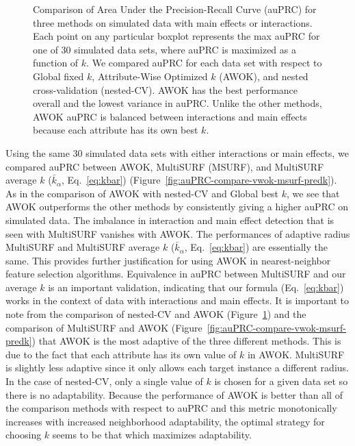 \documentclass[10pt,letterpaper]{article}
\begin{document}
\begin{figure}[!bht]
	\caption{Comparison of Area Under the Precision-Recall Curve (auPRC) for three methods on simulated data with main effects or interactions. Each point on any particular boxplot represents the max auPRC for one of 30 simulated data sets, where auPRC is maximized as a function of $k$. We compared auPRC for each data set with respect to Global fixed $k$, Attribute-Wise Optimized $k$ (AWOK), and nested cross-validation (nested-CV). AWOK has the best performance overall and the lowest variance in auPRC. Unlike the other methods, AWOK auPRC is balanced between interactions and main effects because each attribute has its own best $k$.}\label{fig:auPRC-compare-global-vwok-nCV}
\end{figure}

Using the same 30 simulated data sets with either interactions or main effects, we compared auPRC between AWOK, MultiSURF (MSURF), and MultiSURF average $k$ ($\bar{k}_\alpha$, Eq.~\ref{eq:kbar}) (Figure~\ref{fig:auPRC-compare-vwok-msurf-predk}). As in the comparison of AWOK with nested-CV and Global best $k$, we see that AWOK outperforms the other methods by consistently giving a higher auPRC on simulated data. The imbalance in interaction and main effect detection that is seen with MultiSURF vanishes with AWOK. The performances of adaptive radius MultiSURF and MultiSURF average $k$ ($\bar{k}_\alpha$, Eq.~\ref{eq:kbar}) are essentially the same. This provides further justification for using AWOK in nearest-neighbor feature selection algorithms. Equivalence in auPRC between MultiSURF and our average $k$ is an important validation, indicating that our formula (Eq.~\ref{eq:kbar}) works in the context of data with interactions and main effects. It is important to note from the comparison of nested-CV and AWOK (Figure~\ref{fig:auPRC-compare-global-vwok-nCV}) and the comparison of MultiSURF and AWOK (Figure~\ref{fig:auPRC-compare-vwok-msurf-predk}) that AWOK is the most adaptive of the three different methods. This is due to the fact that each attribute has its own value of $k$ in AWOK. MultiSURF is slightly less adaptive since it only allows each target instance a different radius. In the case of nested-CV, only a single value of $k$ is chosen for a given data set so there is no adaptability. Because the performance of AWOK is better than all of the comparison methods with respect to auPRC and this metric monotonically increases with increased neighborhood adaptability, the optimal strategy for choosing $k$ seems to be that which maximizes adaptability.
\end{document}
